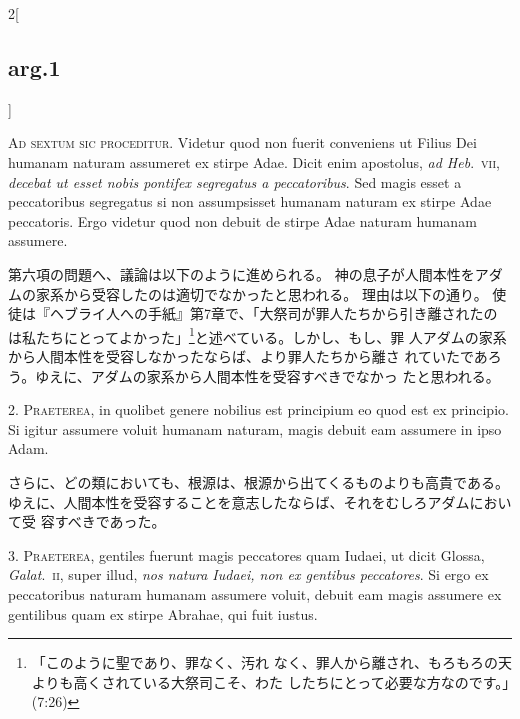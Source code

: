 \documentclass[paper=a4paper,fontsize=10pt,jafontsize=9pt,titlepage]{jlreq}
\begin{document}
\begin{paracol}{2}[\subsection{arg.1}]

{\Huge A}{\scshape d sextum sic proceditur}. Videtur quod non fuerit conveniens ut Filius
Dei humanam naturam assumeret ex stirpe Adae. Dicit enim apostolus, {\itshape ad
Heb}.~{\scshape vii}, {\itshape decebat ut esset nobis pontifex segregatus a peccatoribus}. Sed
magis esset a peccatoribus segregatus si non assumpsisset humanam
naturam ex stirpe Adae peccatoris. Ergo videtur quod non debuit de
stirpe Adae naturam humanam assumere.

\switchcolumn

第六項の問題へ、議論は以下のように進められる。
神の息子が人間本性をアダムの家系から受容したのは適切でなかったと思われる。
 理由は以下の通り。
使徒は『ヘブライ人への手紙』第7章で、「大祭司が罪人たちから引き離されたの
 は私たちにとってよかった」\footnote{「このように聖であり、罪なく、汚れ
 なく、罪人から離され、もろもろの天よりも高くされている大祭司こそ、わた
 したちにとって必要な方なのです。」(7:26)}と述べている。しかし、もし、罪
 人アダムの家系から人間本性を受容しなかったならば、より罪人たちから離さ
 れていたであろう。ゆえに、アダムの家系から人間本性を受容すべきでなかっ
 たと思われる。


2. {\scshape Praeterea}, in quolibet genere nobilius est principium eo quod est ex
principio. Si igitur assumere voluit humanam naturam, magis debuit eam
assumere in ipso Adam.

\switchcolumn

さらに、どの類においても、根源は、根源から出てくるものよりも高貴である。
 ゆえに、人間本性を受容することを意志したならば、それをむしろアダムにおいて受
 容すべきであった。


3. {\scshape Praeterea}, gentiles fuerunt magis peccatores quam Iudaei, ut dicit
Glossa, {\itshape Galat}.~{\scshape ii}, super illud, {\itshape nos natura Iudaei, non ex gentibus
peccatores}. Si ergo ex peccatoribus naturam humanam assumere voluit,
debuit eam magis assumere ex gentilibus quam ex stirpe Abrahae, qui fuit
iustus.


\end{paracol}
\end{document}
